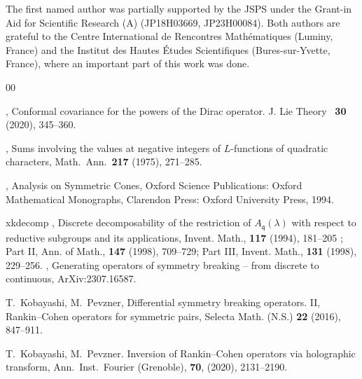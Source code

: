 \documentclass[12pt,leqno]{amsart}
\theoremstyle{plain}
\theoremstyle{definition}
\begin{document}
\vskip 1pc
\small{
\enspace
The first named author was partially supported
 by the JSPS
 under the Grant-in Aid for Scientific Research (A) 
 (JP18H03669, JP23H00084).  
Both authors are grateful to the
Centre International de Rencontres Math{\'e}\-matiques
 (Luminy, France)
 and the
 Institut des Hautes {\'E}tudes Scientifiques
 (Bures-sur-Yvette, France), 
 where an important part of this work was done.  \vskip 1pc





\begin{thebibliography}{00}


{}, 
Conformal covariance for the powers of the Dirac operator.
J. Lie Theory \ {\bf30} (2020), 345--360.

{}, 
Sums involving the values at negative integers of $L$-functions 
 of quadratic characters, 
Math.\ Ann.\ {\bf{217}} (1975), 271--285.  

{}, 
 Analysis on Symmetric Cones, 
Oxford Science Publications:
Oxford Mathematical Monographs, 
Clarendon Press:
Oxford University Press, 1994.  

\bibitem%
{xkdecomp}
   {}, 
   Discrete decomposability of the restriction of
             $A_{\mathfrak {q}}(\lambda)$
            with respect to reductive subgroups and its applications, 
    Invent. Math.,
    {\bf{117}}
    (1994),
    181--205%
;
    Part II, %
    Ann. of Math., 
    {\bf {147}}
    (1998),
    709--729;
    Part III, %
    Invent. Math., 
    {\bf{131}}
    (1998),
    229--256.  
 {}, Generating operators of symmetry breaking -- from discrete to continuous,
ArXiv:2307.16587.

T.\ Kobayashi, M.\ Pevzner, 
Differential symmetry breaking operators. II, 
Rankin--Cohen operators for symmetric pairs, 
Selecta Math. (N.S.) {\bf{22}} (2016), 847--911.

T.\ Kobayashi, M.\ Pevzner. 
Inversion of Rankin--Cohen operators via holographic transform, 
Ann.\ Inst.\ Fourier (Grenoble), {\bf{70}}, (2020), 2131--2190. 


\end{thebibliography}}
\end{document}
